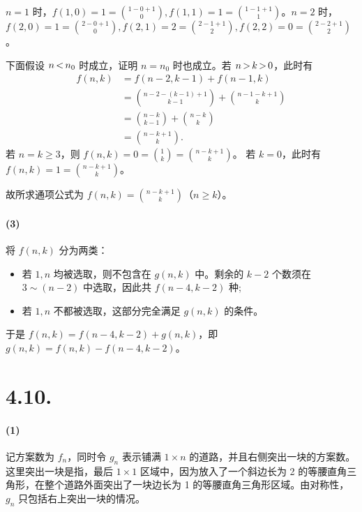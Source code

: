 \documentclass{article}
\DeclareMathOperator*{\lt}{\ensuremath <}
\DeclareMathOperator*{\gt}{\ensuremath >}
\begin{document}
$n=1$ 时，$f(1,0)=1=\binom{1-0+1}{0},f(1,1)=1=\binom{1-1+1}{1}$。$n=2$ 时，$f(2,0)=1=\binom{2-0+1}{0},f(2,1)=2=\binom{2-1+1}{2},f(2,2)=0=\binom{2-2+1}{2}$。

下面假设 $n\lt n_0$ 时成立，证明 $n=n_0$ 时也成立。若 $n\gt k\gt 0$，此时有
\begin{align}
    f(n,k)&=f(n-2,k-1)+f(n-1,k) \\
    &=\binom{n-2-(k-1)+1}{k-1}+\binom{n-1-k+1}{k} \\
    &=\binom{n-k}{k-1}+\binom{n-k}{k} \\
    &=\binom{n-k+1}{k}.
\end{align}
若 $n=k\ge 3$，则 $f(n,k)=0=\binom{1}{k}=\binom{n-k+1}{k}$。
若 $k=0$，此时有 $f(n,k)=1=\binom{n-k+1}{k}$。

故所求通项公式为 $f(n,k)=\binom{n-k+1}{k}$（$n\ge k$）。

\paragraph{(3)}
将 $f(n,k)$ 分为两类：
\begin{itemize}
    \item 若 $1,n$ 均被选取，则不包含在 $g(n,k)$ 中。剩余的 $k-2$ 个数须在 $3\sim (n-2)$ 中选取，因此共 $f(n-4,k-2)$ 种;
    \item 若 $1,n$ 不都被选取，这部分完全满足 $g(n,k)$ 的条件。
\end{itemize}
于是 $f(n,k)=f(n-4,k-2)+g(n,k)$，即 $g(n,k)=f(n,k)-f(n-4,k-2)$。

\section*{4.10.}
\paragraph{(1)}
记方案数为 $f_n$，同时令 $g_n$ 表示铺满 $1\times n$ 的道路，并且右侧突出一块的方案数。这里突出一块是指，最后 $1\times 1$ 区域中，因为放入了一个斜边长为 2 的等腰直角三角形，在整个道路外面突出了一块边长为 1 的等腰直角三角形区域。由对称性，$g_n$ 只包括右上突出一块的情况。
\end{document}
